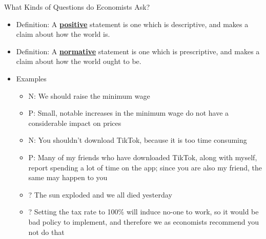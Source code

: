 \documentclass[10pt,xcolor={svgnames}]{beamer}
\begin{document}
\begin{frame}{What Kinds of Questions do Economists Ask?}
    \begin{itemize}
        \item<1-> Definition: A \underline{\textbf{positive}} statement is one which is descriptive, and makes a claim about how the world is. 
        \item<2-> Definition: A \underline{\textbf{normative}} statement is one which is prescriptive, and makes a claim about how the world ought to be. 
        \item<3-> Examples
        \begin{itemize}
            \item<4-> N: We should raise the minimum wage
            \item<4-> P: Small, notable increases in the minimum wage do not have a considerable impact on prices
            
            \item<5-> \vspace{3mm}N: You shouldn't download TikTok, because it is too time consuming
            \item<5-> P: Many of my friends who have downloaded TikTok, along with myself, report spending a lot of time on the app; since you are also my friend, the same may happen to you
            
            \item<6-> \vspace{3mm}? The sun exploded and we all died yesterday
            \item<6-> ? Setting the tax rate to 100\% will induce no-one to work, so it would be bad policy to implement, and therefore we as economists recommend you not do that
        \end{itemize}
    \end{itemize}
\end{frame}
\end{document}
